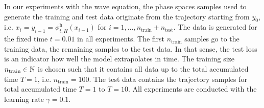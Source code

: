 \documentclass[twoside,a4paper]{article}
\begin{document}
In our experiments with the wave equation, the phase spaces samples
used to generate the training and test data originate from the trajectory
starting from $y_0$, i.e. $x_i = y_{i-1} = \phi^{\text{h}}_{t,H}(x_{i-1})$ for
$i = 1, \dots, n_{\text{train}} + n_{\text{test}}$. The data is generated
for the fixed time $t = 0.01$ in all experiments. 
The first $n_{\text{train}}$ samples go to the training data, the remaining samples
to the test data. In that sense, the test loss is an indicator how well 
the model extrapolates in time. The training size
$n_{\text{train}} \in \mathbb{N}$ is chosen such that it contains all data up to the
total accumulated time $T=1$, i.e. $n_{\text{train}} = 100$. The test data
contains the trajectory samples for total accumulated time $T=1$ to $T=10$.
All experiments are conducted with the learning rate $\gamma = 0.1$.
\end{document}
